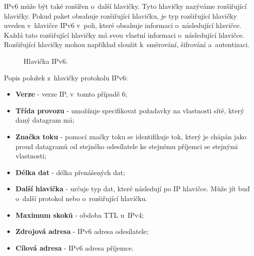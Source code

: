 IPv6 může být také rozšířen o~další hlavičky. Tyto hlavičky nazýváme rozšiřující hlavičky. Pokud paket obsahuje rozšiřující hlavičku, je typ rozšiřující hlavičky uveden v~hlavičce IPv6 v~poli, které obsahuje informaci o~následující hlavičce. Každá tato rozšiřující hlavičky má svou vlastní informaci o~následující hlavičce. Rozšiřující hlavičky mohou například sloužit k~směrování, šifrování a~autentizaci. 

\begin{figure}[H]
    \centering
    \caption{Hlavička IPv6.}
    \label{img:hlavika_ipv6}
\end{figure}

Popis položek z~hlavičky protokolu IPv6:

\begin{itemize}
    \item \textbf{Verze} - verze IP, v~tomto případě 6;
    \item \textbf{Třída provozu} - umožňuje specifikovat požadavky na vlastnosti sítě, který daný datagram má;
    \item \textbf{Značka toku} - pomocí značky toku se identifikuje tok, který je chápán jako proud datagramů od stejného odesílatele ke stejnému příjemci se stejnými vlastnosti;
    \item \textbf{Délka dat} - délka přenášených dat;
    \item \textbf{Další hlavička} - určuje typ dat, které následují po IP hlavičce. Může jít buď o~další protokol nebo o~rozšiřující hlavičku.
    \item \textbf{Maximum skoků} - obdoba TTL u~IPv4;
    \item \textbf{Zdrojová adresa} - IPv6 adresa odesílatele;
    \item \textbf{Cílová adresa} - IPv6 adresa příjemce.
\end{itemize}

